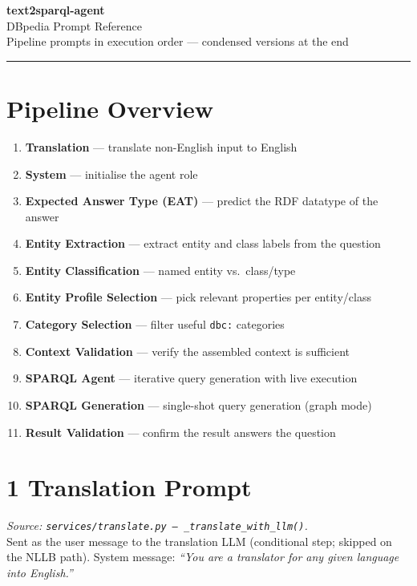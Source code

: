 \documentclass[11pt,a4paper]{article}
\begin{document}
\begin{center}
  {\LARGE\bfseries text2sparql-agent}\\[4pt]
  {\large DBpedia Prompt Reference}\\[8pt]
  {\small Pipeline prompts in execution order --- condensed versions at the end}
\end{center}
\vspace{1em}\hrule\vspace{1.5em}

\section*{Pipeline Overview}
\begin{enumerate}[leftmargin=2em,itemsep=2pt]
  \item \textbf{Translation} --- translate non-English input to English
  \item \textbf{System} --- initialise the agent role
  \item \textbf{Expected Answer Type (EAT)} --- predict the RDF datatype of the answer
  \item \textbf{Entity Extraction} --- extract entity and class labels from the question
  \item \textbf{Entity Classification} --- named entity vs.\ class/type
  \item \textbf{Entity Profile Selection} --- pick relevant properties per entity/class
  \item \textbf{Category Selection} --- filter useful \texttt{dbc:} categories
  \item \textbf{Context Validation} --- verify the assembled context is sufficient
  \item \textbf{SPARQL Agent} --- iterative query generation with live execution
  \item \textbf{SPARQL Generation} --- single-shot query generation (graph mode)
  \item \textbf{Result Validation} --- confirm the result answers the question
\end{enumerate}
\bigskip

\section{1 \quad Translation Prompt}
\textit{Source: \texttt{services/translate.py --- \_translate\_with\_llm()}.}\\
Sent as the user message to the translation LLM (conditional step; skipped on the NLLB path). System message: \emph{``You are a translator for any given language into English.''}
\end{document}
